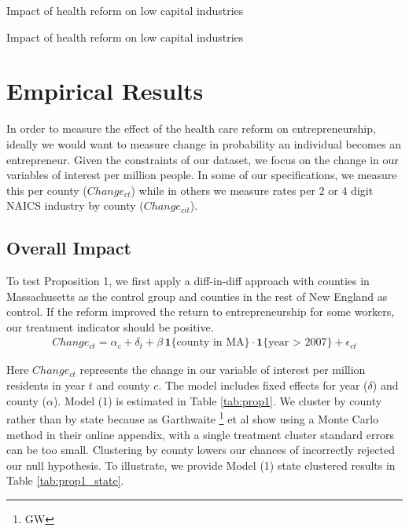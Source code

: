 \documentclass[12pt]{article}
\begin{document}
\begin{table}[H]
	\centering
	
	\caption{Impact of health reform on low capital industries}
	\label{tab:capital_ne}
\end{table}

\begin{table}[H]
	\centering
	
	\caption{Impact of health reform on low capital industries}
	\label{tab:capital_em}
\end{table}


\section{Empirical Results}
\label{sec:results}

In order to measure the effect of the health care reform on entrepreneurship, ideally we would want to measure change in probability an individual becomes an entrepreneur. Given the constraints of our dataset, we focus on the change in our variables of interest per million people. In some of our specifications, we measure this per county ($Change_{ct}$) while in others we measure rates per 2 or 4 digit NAICS industry by county ($Change_{cit}$). 

\subsection{Overall Impact}

To test Proposition 1, we first apply a diff-in-diff approach with counties in Massachusetts as the control group and counties in the rest of New England as control. If the reform improved the return to entrepreneurship for some workers, our treatment indicator should be positive. 
\begin{align}
Change_{ct} = \alpha_c + \delta_t + \beta \, \mathbf{1}\{\text{county in MA}\} \cdot \mathbf{1}\{\text{year > 2007}\} + \epsilon_{ct}
\end{align}

Here $Change_{ct}$ represents the change in our variable of interest per million residents in year $t$ and county $c$. The model includes fixed effects for year ($\delta$) and county ($\alpha$). Model (1) is estimated in Table \ref{tab:prop1}. We cluster by county rather than by state because as Garthwaite \footnote{GW} et al show using a Monte Carlo method in their online appendix, with a single treatment cluster standard errors can be too small. Clustering by county lowers our chances of incorrectly rejected our null hypothesis. To illustrate, we provide Model (1) state clustered results in Table \ref{tab:prop1_state}. 
\end{document}
